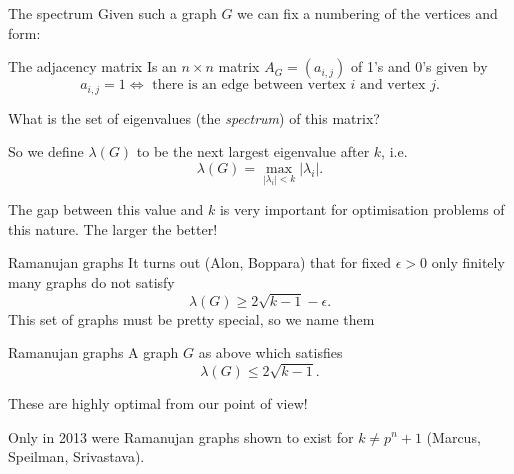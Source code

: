 \documentclass{beamer}
\begin{document}
\begin{frame}{The spectrum}
Given such a graph $G$ we can fix a numbering of the vertices and form:
\begin{block}{The adjacency matrix}
Is an $n\times n$ matrix $A_G = (a_{i,j})$ of 1's and 0's given by
\[a_{i,j} = 1 \iff \text{ there is an edge between vertex $i$ and vertex $j$}.\]
\end{block}
\pause What is the set of eigenvalues (the \emph{spectrum}) of this matrix?

\pause So we define $\lambda(G)$ to be the next largest eigenvalue after $k$, i.e.
\[\lambda(G) = \max_{|\lambda_i| < k} |\lambda_i|.\]

\pause The gap between this value and $k$ is very important for optimisation problems of this nature. The larger the better!
\end{frame}

\begin{frame}{Ramanujan graphs}
It turns out (Alon, Boppara) that for fixed $\epsilon > 0$ only finitely many graphs do not satisfy 
\[\lambda(G) \ge 2\sqrt{k-1} - \epsilon.\]
\pause This set of graphs must be pretty special, so we name them
\begin{block}{Ramanujan graphs}
A graph $G$ as above which satisfies
\[\lambda(G) \le 2\sqrt{k-1}.\]
\end{block}
These are highly optimal from our point of view! 

\pause Only in 2013 were Ramanujan graphs shown to exist for $k \ne p^n + 1$ (Marcus, Speilman, Srivastava).
\end{frame}
\end{document}
